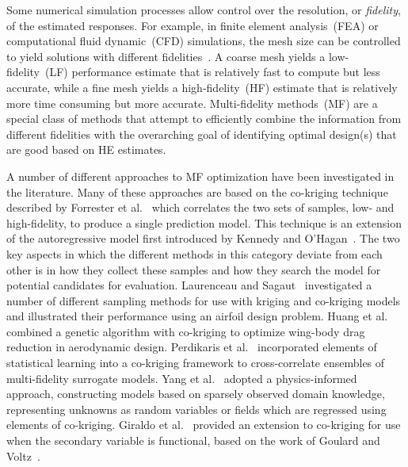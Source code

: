 Some numerical simulation processes allow control over the resolution, or \emph{fidelity}, of the estimated responses. For example, in finite element analysis~(FEA) or computational fluid dynamic~(CFD) simulations, the mesh size can be controlled to yield solutions with different fidelities~\cite{branke2016efficient,toal2015some}. A coarse mesh yields a low-fidelity~(LF) performance estimate that is relatively fast to compute but less accurate, while a fine mesh yields a high-fidelity~(HF) estimate that is relatively more time consuming but more accurate. Multi-fidelity  methods~(MF) are a special class of methods that attempt to efficiently combine the information from different fidelities with the overarching goal of identifying optimal design(s) that are good based on HE estimates. 

A number of different approaches to MF optimization have been investigated in the literature. Many of these approaches are based on the co-kriging technique described by Forrester et al.~\cite{forrester2007multi} which correlates the two sets of samples, low- and high-fidelity, to produce a single prediction model. This technique is an extension of the autoregressive model first introduced by Kennedy and O'Hagan~\cite{kennedy2000predicting}. The two key aspects in which the different methods in this category deviate from each other is in how they collect these samples and how they search the model for potential candidates for evaluation. Laurenceau and Sagaut~\cite{laurenceau2008building} investigated a number of different sampling methods for use with kriging and co-kriging models and illustrated their performance using an airfoil design problem. Huang et al.~\cite{huang2013research} combined a genetic algorithm with co-kriging to optimize wing-body drag reduction in aerodynamic design. Perdikaris et al.~\cite{perdikaris2015multi} incorporated elements of statistical learning into a co-kriging framework to cross-correlate ensembles of multi-fidelity surrogate models. Yang et al.~\cite{yang2019physics} adopted a physics-informed approach, constructing models based on sparsely observed domain knowledge, representing unknowns as random variables or fields which are regressed using elements of co-kriging. Giraldo et al.~\cite{giraldo2020cokriging} provided an extension to co-kriging for use when the secondary variable is functional, based on the work of Goulard and Voltz~\cite{goulard1993geostatistical}.

